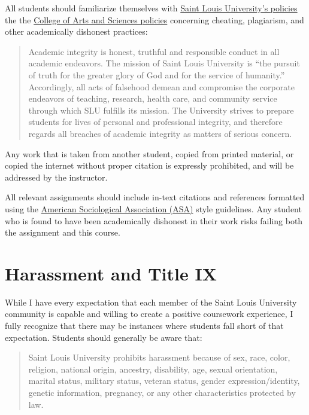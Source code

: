 \documentclass[]{book}
\begin{document}
All students should familiarize themselves with \href{https://www.slu.edu/provost/policies/academic-and-course/policy_academic-integrity_6-26-2015.pdf}{Saint Louis University's policies} the the \href{https://www.slu.edu/arts-and-sciences/student-resources/academic-honesty.php}{College of Arts and Sciences policies} concerning cheating, plagiarism, and other academically dishonest practices:

\begin{quote}
Academic integrity is honest, truthful and responsible conduct in all academic endeavors. The mission of Saint Louis University is ``the pursuit of truth for the greater glory of God and for the service of humanity.'' Accordingly, all acts of falsehood demean and compromise the corporate endeavors of teaching, research, health care, and community service through which SLU fulfills its mission. The University strives to prepare students for lives of personal and professional integrity, and therefore regards all breaches of academic integrity as matters of serious concern.
\end{quote}

Any work that is taken from another student, copied from printed material, or copied the internet without proper citation is expressly prohibited, and will be addressed by the instructor.

All relevant assignments should include in-text citations and references formatted using the \href{https://owl.english.purdue.edu/owl/resource/583/1/}{American Sociological Association (ASA)} style guidelines. Any student who is found to have been academically dishonest in their work risks failing both the assignment and this course.

\hypertarget{harassment-and-title-ix}{%
\section{Harassment and Title IX}\label{harassment-and-title-ix}}

While I have every expectation that each member of the Saint Louis University community is capable and willing to create a positive coursework experience, I fully recognize that there may be instances where students fall short of that expectation. Students should generally be aware that:

\begin{quote}
Saint Louis University prohibits harassment because of sex, race, color, religion, national origin, ancestry, disability, age, sexual orientation, marital status, military status, veteran status, gender expression/identity, genetic information, pregnancy, or any other characteristics protected by law.
\end{quote}
\end{document}

